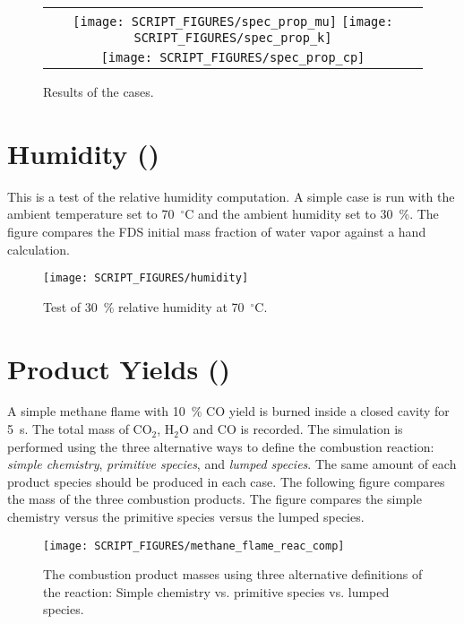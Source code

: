 \documentclass[11pt]{book}
\begin{document}
\begin{figure}[ht]
    \centering
    \begin{tabular}{c}
      \texttt{[image: SCRIPT\_FIGURES/spec\_prop\_mu]}
      \texttt{[image: SCRIPT\_FIGURES/spec\_prop\_k]} \\
      \texttt{[image: SCRIPT\_FIGURES/spec\_prop\_cp]}
   \end{tabular}
   \caption[Results of the  cases]{Results of the  cases.}
   \label{fig_species_props}
\end{figure}

\section{Humidity (\texorpdfstring{}{humidity})}
\label{humidity}

This is a test of the relative humidity computation. A simple case is run with the ambient temperature set to 70~$^{\circ}$C and the ambient humidity set to 30~\%. The figure compares  the FDS initial mass fraction of water vapor against a hand calculation.

\begin{figure}[ht]
    \centering
    \texttt{[image: SCRIPT\_FIGURES/humidity]}
    \caption[Test of 30~\% relative humidity at 70~$^{\circ}$C]{Test of 30~\% relative humidity at 70~$^{\circ}$C. }
    \label{fig_humidity}
\end{figure}

\section{Product Yields (\texorpdfstring{}{methane\_flame})}
\label{methane_flame}

A simple methane flame with 10~\% CO yield is burned inside a closed cavity for 5~s.
The total mass of CO$_2$, H$_2$O and CO is recorded.
The simulation is performed using the three alternative ways
to define the combustion reaction: {\em simple chemistry}, {\em primitive species}, and {\em lumped species}. The
same amount of each product species should be produced in each case. The following figure compares the
mass of the three combustion products. The figure compares the simple chemistry versus the primitive species versus the lumped species.
\begin{figure}[ht]
\centering
\texttt{[image: SCRIPT\_FIGURES/methane\_flame\_reac\_comp]}
\caption[Yield of combustion products for alternative reactions]{The combustion product masses using three alternative definitions of the reaction:  Simple chemistry vs. primitive species vs. lumped species. }
\label{fig_methane_flame_yields}
\end{figure}
\end{document}
